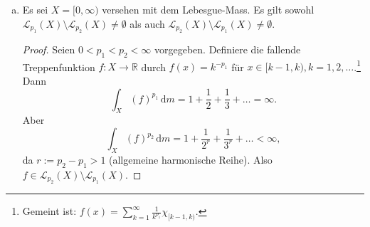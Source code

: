 \documentclass[10pt]{article}\usepackage[]{graphicx}\usepackage[]{color}
\newcommand{\N}{\mathbb{N}}
\newcommand{\R}{\mathbb{R}}
\newcommand{\C}{\mathbb{C}}
\newcommand{\df}{\,\textrm{d}}
\begin{document}
\begin{enumerate}[(a)]
\begin{proof}
          Im unendlichen Fall heisst
          \[
            \sum_{k=1}^{\infty} |f(x_k)|^{p_1} < \infty,
          \]
          dass diese Reihe absolut konvergiert. Also
          dürfen wir die Summanden so umordnen, dass
          $|f(x_k)|^{p_1} \geq |f(x_{k+1})|^{p_1}$ für alle $k \in \N$.
          Wegen der Konvergenz muss weiter ein $N \in \N$
          existieren, sodass $|f(x_k)|^{p_1} < 1$
          für alle $k \geq N$. Da $p_2 > p_1$, gilt für solche
          $k$ dann
          $|f(x_k)|^{p_2} \leq  |f(x_k)|^{p_1}$. Also
          \begin{align*}
            \sum_{k=1}^{\infty} |f(x_k)|^{p_2}
            &= \sum_{k=1}^{N-1} |f(x_k)|^{p_2} + \sum_{k=N}^{\infty} |f(x_k)|^{p_2}.
          \end{align*}
          Der erste Teil ist endlich, also konvergent;
          der zweite Teil wird von der konvergenten
          Reihe $\sum_{k=N}^{\infty} |f(x_k)|^{p_1}$
          majorisiert und ist also auch konvergent.
          Somit 
          $\mathscr{L}_{p_1}(\mu) \subset \mathscr{L}_{p_2}(\mu)$.
          
          Betrachten wir jedoch zu vorgegebenem $p_1$
          und $X = \{x_1, x_2, \dots\}$
          die Abbildung
          \begin{align*}
            f:  X     &\to       \C,\\
                x_k   &\mapsto   k^{-1/p_1},
          \end{align*}
          so stellen wir fest, dass für $p_2 > p_1$ gilt:
          \[
            \sum_{k=1}^{\infty} |f(x_k)|^{p_2} = \sum_{k=1}^{\infty} \frac{1}{k^{p_2/p_1}} < \infty,
          \]
          da $p_2/p_1 > 1$ (allgemeine harmonische Reihe).
          Jedoch
          \[
            \sum_{k=1}^{\infty} |f(x_k)|^{p_1} = \sum_{k=1}^{\infty} \frac{1}{k},
          \]
          was gegen $\infty$ divergiert.
          Also ist die obige Inklusion strikt.
        \end{proof}
        
  \item Es sei $X = [0, \infty)$ versehen mit dem Lebesgue-Mass.
        Es gilt sowohl $\mathscr{L}_{p_1}(X) \setminus \mathscr{L}_{p_2}(X) \neq \emptyset$ als auch
        $\mathscr{L}_{p_2}(X) \setminus \mathscr{L}_{p_1}(X) \neq \emptyset$.
        
        \begin{proof}
          Seien $0 < p_1 < p_2 < \infty$ vorgegeben.
          Definiere die fallende Treppenfunktion $f: X \to \R$ durch
          $f(x) = k^{-p_1}$ für $x \in [k-1, k), k = 1, 2, \dots$.\footnote{Gemeint ist: $f(x) = \sum_{k=1}^{\infty} \frac{1}{k^{p_1}} \chi_{[k-1,k)}$.}
          Dann 
          \[
            \int_X (f)^{p_1} \df m = 1 + \frac{1}{2} + \frac{1}{3} + \dots = \infty.
          \]
          Aber
          \[
            \int_X (f)^{p_2} \df m = 1 + \frac{1}{2^r} + \frac{1}{3^r} + \dots < \infty,
          \]
          da $r := p_2-p_1 > 1$ (allgemeine harmonische Reihe).
          Also $f \in \mathscr{L}_{p_2}(X) \setminus \mathscr{L}_{p_1}(X)$.
          

\end{proof}
\end{enumerate}
\end{document}
